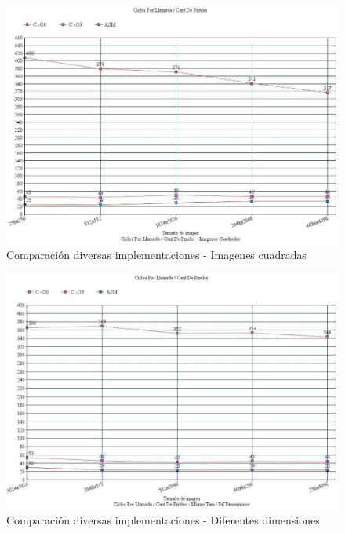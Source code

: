 \begin{figure}[h!]
\centering
\captionsetup{justification=centering}
	\includegraphics[width = 15 cm, height = 8 cm]{imagenes/ImgCuadradas.jpg}
	\caption[center]{Comparación diversas implementaciones - Imagenes cuadradas}
\end{figure}

\medskip
\begin{figure}[h!]
\centering
\captionsetup{justification=centering}
	\includegraphics[width = 15 cm, height = 8 cm]{imagenes/DifDimensiones.jpg}
	\caption[center]{Comparación diversas implementaciones - Diferentes dimensiones }
\end{figure}

\medskip

